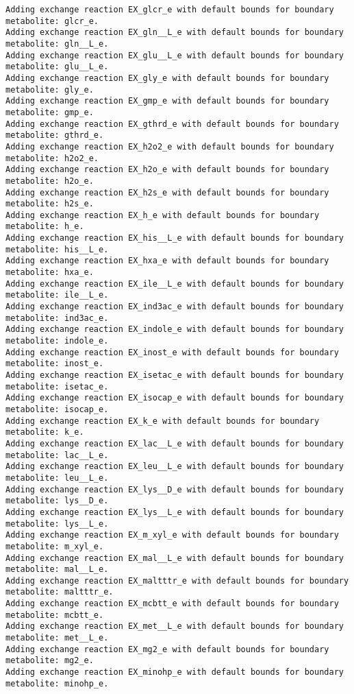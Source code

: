 \documentclass[
  letterpaper,
  DIV=11,
  numbers=noendperiod]{scrartcl}
\begin{document}
\begin{verbatim}
Adding exchange reaction EX_glcr_e with default bounds for boundary metabolite: glcr_e.
Adding exchange reaction EX_gln__L_e with default bounds for boundary metabolite: gln__L_e.
Adding exchange reaction EX_glu__L_e with default bounds for boundary metabolite: glu__L_e.
Adding exchange reaction EX_gly_e with default bounds for boundary metabolite: gly_e.
Adding exchange reaction EX_gmp_e with default bounds for boundary metabolite: gmp_e.
Adding exchange reaction EX_gthrd_e with default bounds for boundary metabolite: gthrd_e.
Adding exchange reaction EX_h2o2_e with default bounds for boundary metabolite: h2o2_e.
Adding exchange reaction EX_h2o_e with default bounds for boundary metabolite: h2o_e.
Adding exchange reaction EX_h2s_e with default bounds for boundary metabolite: h2s_e.
Adding exchange reaction EX_h_e with default bounds for boundary metabolite: h_e.
Adding exchange reaction EX_his__L_e with default bounds for boundary metabolite: his__L_e.
Adding exchange reaction EX_hxa_e with default bounds for boundary metabolite: hxa_e.
Adding exchange reaction EX_ile__L_e with default bounds for boundary metabolite: ile__L_e.
Adding exchange reaction EX_ind3ac_e with default bounds for boundary metabolite: ind3ac_e.
Adding exchange reaction EX_indole_e with default bounds for boundary metabolite: indole_e.
Adding exchange reaction EX_inost_e with default bounds for boundary metabolite: inost_e.
Adding exchange reaction EX_isetac_e with default bounds for boundary metabolite: isetac_e.
Adding exchange reaction EX_isocap_e with default bounds for boundary metabolite: isocap_e.
Adding exchange reaction EX_k_e with default bounds for boundary metabolite: k_e.
Adding exchange reaction EX_lac__L_e with default bounds for boundary metabolite: lac__L_e.
Adding exchange reaction EX_leu__L_e with default bounds for boundary metabolite: leu__L_e.
Adding exchange reaction EX_lys__D_e with default bounds for boundary metabolite: lys__D_e.
Adding exchange reaction EX_lys__L_e with default bounds for boundary metabolite: lys__L_e.
Adding exchange reaction EX_m_xyl_e with default bounds for boundary metabolite: m_xyl_e.
Adding exchange reaction EX_mal__L_e with default bounds for boundary metabolite: mal__L_e.
Adding exchange reaction EX_maltttr_e with default bounds for boundary metabolite: maltttr_e.
Adding exchange reaction EX_mcbtt_e with default bounds for boundary metabolite: mcbtt_e.
Adding exchange reaction EX_met__L_e with default bounds for boundary metabolite: met__L_e.
Adding exchange reaction EX_mg2_e with default bounds for boundary metabolite: mg2_e.
Adding exchange reaction EX_minohp_e with default bounds for boundary metabolite: minohp_e.

\end{verbatim}
\end{document}

